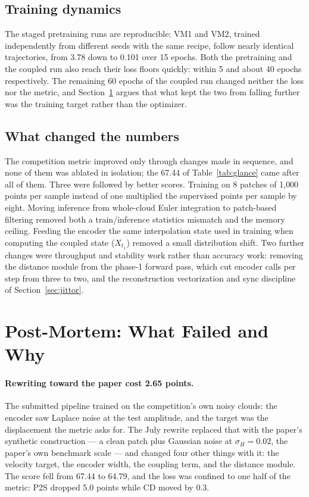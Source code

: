 \documentclass{article}
\begin{document}
\subsection{Training dynamics}

The staged pretraining runs are reproducible: VM1 and VM2, trained independently from different seeds with the same recipe, follow nearly identical trajectories, from 3.78 down to 0.101 over 15 epochs. Both the pretraining and the coupled run also reach their loss floors quickly: within 5 and about 40 epochs respectively. The remaining 60 epochs of the coupled run changed neither the loss nor the metric, and Section~\ref{sec:postmortem} argues that what kept the two from falling further was the training target rather than the optimizer.

\subsection{What changed the numbers}

The competition metric improved only through changes made in sequence, and none of them was ablated in isolation; the 67.44 of Table~\ref{tab:glance} came after all of them. Three were followed by better scores. Training on 8 patches of 1{,}000 points per sample instead of one multiplied the supervised points per sample by eight. Moving inference from whole-cloud Euler integration to patch-based filtering removed both a train/inference statistics mismatch and the memory ceiling. Feeding the encoder the same interpolation state used in training when computing the coupled state ($X_{t_1}$) removed a small distribution shift. Two further changes were throughput and stability work rather than accuracy work: removing the distance module from the phase-1 forward pass, which cut encoder calls per step from three to two, and the reconstruction vectorization and sync discipline of Section~\ref{sec:jittor}.

\section{Post-Mortem: What Failed and Why}
\label{sec:postmortem}

\paragraph{Rewriting toward the paper cost 2.65 points.} The submitted pipeline trained on the competition's own noisy clouds: the encoder saw Laplace noise at the test amplitude, and the target was the displacement the metric asks for. The July rewrite replaced that with the paper's synthetic construction --- a clean patch plus Gaussian noise at $\sigma_H = 0.02$, the paper's own benchmark scale --- and changed four other things with it: the velocity target, the encoder width, the coupling term, and the distance module. The score fell from 67.44 to 64.79, and the loss was confined to one half of the metric: P2S dropped 5.0 points while CD moved by 0.3.
\end{document}
